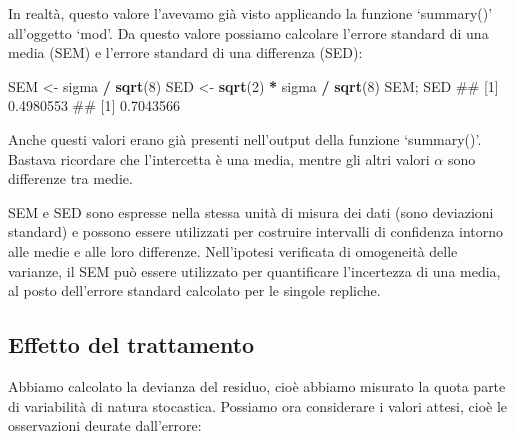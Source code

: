 \documentclass[a4paper,12pt,oneside]{book}
\newenvironment{Shaded}{\begin{snugshade}}{\end{snugshade}}
\newcommand{\KeywordTok}[1]{\textcolor[rgb]{0.13,0.29,0.53}{\textbf{#1}}}
\newcommand{\DecValTok}[1]{\textcolor[rgb]{0.00,0.00,0.81}{#1}}
\newcommand{\StringTok}[1]{\textcolor[rgb]{0.31,0.60,0.02}{#1}}
\newcommand{\OperatorTok}[1]{\textcolor[rgb]{0.81,0.36,0.00}{\textbf{#1}}}
\newcommand{\NormalTok}[1]{#1}
\theoremstyle{definition}
\theoremstyle{definition}
\theoremstyle{definition}
\theoremstyle{remark}
\begin{document}
In realtà, questo valore l'avevamo già visto applicando la funzione
`summary()' all'oggetto `mod'. Da questo valore possiamo calcolare
l'errore standard di una media (SEM) e l'errore standard di una
differenza (SED):

\begin{Shaded}
\begin{Highlighting}[]
\NormalTok{SEM <-}\StringTok{ }\NormalTok{sigma }\OperatorTok{/}\StringTok{ }\KeywordTok{sqrt}\NormalTok{(}\DecValTok{8}\NormalTok{)}
\NormalTok{SED <-}\StringTok{ }\KeywordTok{sqrt}\NormalTok{(}\DecValTok{2}\NormalTok{) }\OperatorTok{*}\StringTok{ }\NormalTok{sigma }\OperatorTok{/}\StringTok{ }\KeywordTok{sqrt}\NormalTok{(}\DecValTok{8}\NormalTok{)}
\NormalTok{SEM; SED}
\NormalTok{## [1] 0.4980553}
\NormalTok{## [1] 0.7043566}
\end{Highlighting}
\end{Shaded}

Anche questi valori erano già presenti nell'output della funzione
`summary()'. Bastava ricordare che l'intercetta è una media, mentre gli
altri valori \(\alpha\) sono differenze tra medie.

SEM e SED sono espresse nella stessa unità di misura dei dati (sono
deviazioni standard) e possono essere utilizzati per costruire
intervalli di confidenza intorno alle medie e alle loro differenze.
Nell'ipotesi verificata di omogeneità delle varianze, il SEM può essere
utilizzato per quantificare l'incertezza di una media, al posto
dell'errore standard calcolato per le singole repliche.

\subsection{Effetto del trattamento}\label{effetto-del-trattamento}

Abbiamo calcolato la devianza del residuo, cioè abbiamo misurato la
quota parte di variabilità di natura stocastica. Possiamo ora
considerare i valori attesi, cioè le osservazioni deurate dall'errore:
\end{document}
